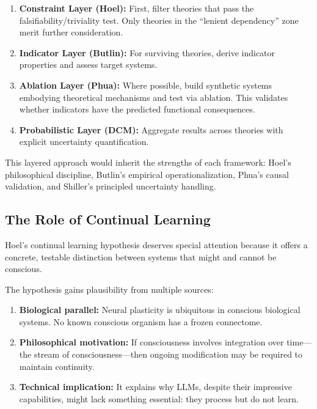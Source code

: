 \begin{enumerate}
    \item \textbf{Constraint Layer (Hoel):} First, filter theories that pass the falsifiability/triviality test. Only theories in the ``lenient dependency'' zone merit further consideration.

    \item \textbf{Indicator Layer (Butlin):} For surviving theories, derive indicator properties and assess target systems.

    \item \textbf{Ablation Layer (Phua):} Where possible, build synthetic systems embodying theoretical mechanisms and test via ablation. This validates whether indicators have the predicted functional consequences.

    \item \textbf{Probabilistic Layer (DCM):} Aggregate results across theories with explicit uncertainty quantification.
\end{enumerate}

This layered approach would inherit the strengths of each framework: Hoel's philosophical discipline, Butlin's empirical operationalization, Phua's causal validation, and Shiller's principled uncertainty handling.

\subsection{The Role of Continual Learning}

Hoel's continual learning hypothesis deserves special attention because it offers a concrete, testable distinction between systems that might and cannot be conscious.

The hypothesis gains plausibility from multiple sources:

\begin{enumerate}
    \item \textbf{Biological parallel:} Neural plasticity is ubiquitous in conscious biological systems. No known conscious organism has a frozen connectome.

    \item \textbf{Philosophical motivation:} If consciousness involves integration over time---the stream of consciousness---then ongoing modification may be required to maintain continuity.

    \item \textbf{Technical implication:} It explains why LLMs, despite their impressive capabilities, might lack something essential: they process but do not learn.
\end{enumerate}

